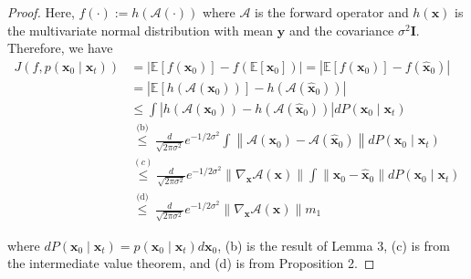 \begin{theorem}[定理1的证明]
\begin{proof}
Here, $f(\cdot):=h(\mathcal{A}(\cdot))$ where $\mathcal{A}$ is the forward operator and $h(\boldsymbol{x})$ is the multivariate normal distribution with mean $\boldsymbol{y}$ and the covariance $\sigma^2 \boldsymbol{I}$. Therefore, we have
\begin{align}
J\left(f, p\left(\boldsymbol{x}_0 \mid \boldsymbol{x}_t\right)\right) & =\left|\mathbb{E}\left[f\left(\boldsymbol{x}_0\right)\right]-f\left(\mathbb{E}\left[\boldsymbol{x}_0\right]\right)\right|=\left|\mathbb{E}\left[f\left(\boldsymbol{x}_0\right)\right]-f\left(\hat{\boldsymbol{x}}_0\right)\right| \\
& =\left|\mathbb{E}\left[h\left(\mathcal{A}\left(\boldsymbol{x}_0\right)\right)\right]-h\left(\mathcal{A}\left(\hat{\boldsymbol{x}}_0\right)\right)\right| \\
& \leq \int\left|h\left(\mathcal{A}\left(\boldsymbol{x}_0\right)\right)-h\left(\mathcal{A}\left(\hat{\boldsymbol{x}}_0\right)\right)\right| d P\left(\boldsymbol{x}_0 \mid \boldsymbol{x}_t\right) \\
& \stackrel{\text { (b) }}{\leq} \frac{d}{\sqrt{2 \pi \sigma^2}} e^{-1 / 2 \sigma^2} \int\left\|\mathcal{A}\left(\boldsymbol{x}_0\right)-\mathcal{A}\left(\hat{\boldsymbol{x}}_0\right)\right\| d P\left(\boldsymbol{x}_0 \mid \boldsymbol{x}_t\right) \\
& \stackrel{(c)}{\leq} \frac{d}{\sqrt{2 \pi \sigma^2}} e^{-1 / 2 \sigma^2}\left\|\nabla_{\boldsymbol{x}} \mathcal{A}(\boldsymbol{x})\right\| \int\left\|\boldsymbol{x}_0-\hat{\boldsymbol{x}}_0\right\| d P\left(\boldsymbol{x}_0 \mid \boldsymbol{x}_t\right) \\
& \stackrel{\text { (d) }}{\leq} \frac{d}{\sqrt{2 \pi \sigma^2}} e^{-1 / 2 \sigma^2}\left\|\nabla_{\boldsymbol{x}} \mathcal{A}(\boldsymbol{x})\right\| m_1
\end{align}

where $d P\left(\boldsymbol{x}_0 \mid \boldsymbol{x}_t\right)=p\left(\boldsymbol{x}_0 \mid \boldsymbol{x}_t\right) d \boldsymbol{x}_0$, (b) is the result of Lemma 3, (c) is from the intermediate value theorem, and (d) is from Proposition 2.   
\end{proof}
\end{theorem}







